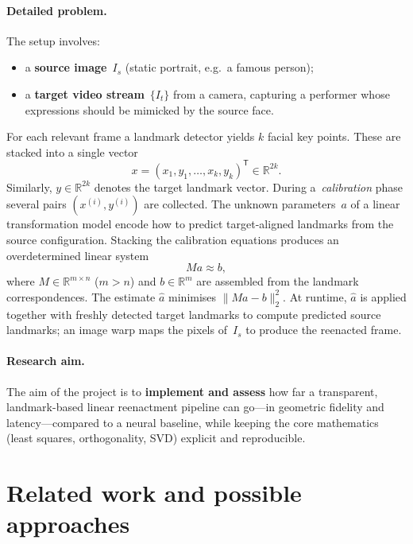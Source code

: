 \documentclass[11pt,a4paper]{article}
\begin{document}
\paragraph{Detailed problem.}
The setup involves:
\begin{itemize}
  \item a \textbf{source image}~$I_s$ (static portrait, e.g.\ a famous person);
  \item a \textbf{target video stream}~$\{I_t\}$ from a camera, capturing a
        performer whose expressions should be mimicked by the source face.
\end{itemize}
For each relevant frame a landmark detector yields $k$ facial key points. These are
stacked into a single vector
\begin{equation}
  x = (x_1,y_1,\ldots,x_k,y_k)^{\mathsf T} \in \mathbb{R}^{2k}.
  \label{eq:landmark-vec}
\end{equation}
Similarly, $y \in \mathbb{R}^{2k}$ denotes the target landmark vector. During
a~\emph{calibration} phase several pairs $(x^{(i)}, y^{(i)})$ are collected. The
unknown parameters~$a$ of a linear transformation model encode how to predict
target-aligned landmarks from the source configuration. Stacking the calibration
equations produces an overdetermined linear system
\begin{equation}
  M a \approx b,
  \label{eq:Ma-b}
\end{equation}
where $M \in \mathbb{R}^{m \times n}$ ($m > n$) and $b \in \mathbb{R}^{m}$ are
assembled from the landmark correspondences. The estimate $\hat{a}$ minimises
$\|Ma-b\|_2^2$. At runtime, $\hat{a}$ is applied together with freshly detected
target landmarks to compute predicted source landmarks; an image warp maps the
pixels of~$I_s$ to produce the reenacted frame.

\paragraph{Research aim.}
The aim of the project is to \textbf{implement and assess} how far a transparent,
landmark-based linear reenactment pipeline can go---in geometric fidelity and
latency---compared to a neural baseline, while keeping the core mathematics
(least squares, orthogonality, SVD) explicit and reproducible.

\section{Related work and possible approaches}
\label{sec:related}
\end{document}
